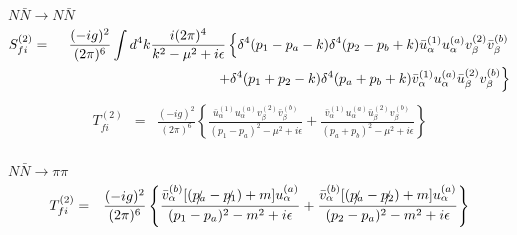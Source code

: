 \bigskip 

\noindent
\underline{$N\bar{N} \to N\bar{N}$}\\
\begin{eqnarray}
S_{fi}^{(2)}
&=&
\frac{(-ig)^2}{(2\pi)^6}
\int d^4 k
\frac{i (2\pi)^4}{k^2 - \mu^2 + i\epsilon}
\left\{
\delta^4(p_1 - p_a - k) \delta^4(p_2 - p_b + k)
\bar{u}_\alpha^{(1)} u_\alpha^{(a)} v_\beta^{(2)} \bar{v}_\beta^{(b)}
\right.
\nonumber\\
&&
\hspace{40mm}
\left.
+
\delta^4(p_1 + p_2 - k) \delta^4(p_a + p_b + k)
\bar{v}_\alpha^{(1)} u_\alpha^{(a)} \bar{u}_\beta^{(2)} v_\beta^{(b)}
\right\}
\nonumber\\
\end{eqnarray}
\begin{eqnarray}
T_{fi}^{(2)}
&=&
\frac{(-ig)^2}{(2\pi)^6}
\left\{
\frac{\bar{u}_\alpha^{(1)} u_\alpha^{(a)} v_\beta^{(2)} \bar{v}_\beta^{(b)}}
{(p_1 - p_a)^2 - \mu^2 + i \epsilon}
+
\frac{\bar{v}_\alpha^{(1)} u_\alpha^{(a)} \bar{u}_\beta^{(2)} v_\beta^{(b)}}
{(p_a +  p_b)^2 - \mu^2 + i \epsilon}
\right\}
\nonumber\\
\end{eqnarray}

\bigskip 

\noindent
\underline{$N\bar{N} \to \pi \pi$}\\
\begin{eqnarray}
T_{fi}^{(2)}
&=&
\frac{(-ig)^2}{(2\pi)^6}
\left\{
\frac{ \bar{v}_\alpha^{(b)} [(\slashed{p_a} - \slashed{p_1}) + m] u_\alpha^{(a)} }
{(p_1 - p_a)^2 - m^2 + i \epsilon}
+
\frac{ \bar{v}_\alpha^{(b)} [(\slashed{p_a} - \slashed{p_2}) + m] u_\alpha^{(a)} }
{(p_2 - p_a)^2 - m^2 + i \epsilon}
\right\}
\nonumber\\
\end{eqnarray}
